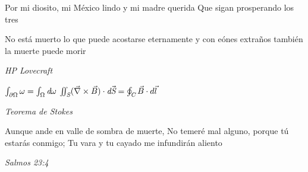 \documentclass[12pt]{article}
\begin{document}
	\titlespacing{\subsection}{0pt}{10pt}{45pt}
	\renewcommand{\thesection}{\Roman{section}} 
	\renewcommand{\thesubsection}{\thesection.\Roman{subsection}}
	\renewcommand{\thesubsubsection}{\thesection.\thesubsection.\Roman{subsubsection}}
	
	\title{\Huge{}}
	\author{Salvador Guzm\'{a}n Jr}
	\date{\today}
	\maketitle
	
	\pagebreak
	\begin{center}
		Por mi diosito, mi M\'{e}xico lindo y mi madre querida
		\linebreak
		Que sigan prosperando los tres
	\end{center}
	\pagebreak
	\begin{center}
		\epigraph{
			No est\'{a} muerto lo que puede acostarse eternamente
			y con e\'{o}nes extraños tambi\'{e}n la muerte
			puede morir
		}{\textit{
			HP Lovecraft
		}}
		\epigraph{
			\begin{math}
				\int_{\partial\Omega} \omega=\int_{\Omega} \emph{d}\omega
			\end{math}
			\linebreak
			\linebreak
			\begin{math}
				\iint_{\emph{S}}(\vec{\nabla}\times\vec{B})\cdot \emph{d}\vec{\emph{S}}=\oint_{\emph{C}}\vec{B}\cdot d \vec{l}
			\end{math}
		}{
			\textit{Teorema de Stokes}
		}

		\epigraph{
			Aunque ande en valle de sombra de muerte,
			No temer\'{e} mal alguno, porque t\'{u} estarás conmigo;
			Tu vara y tu cayado me infundir\'{a}n aliento
		}{
			\textit{Salmos 23:4}
		}
	\end{center}
	\pagebreak
	{\frakfamily
		\tableofcontents
	}

	\pagebreak
	
	\section{}
	\subsection{}
\end{document}
